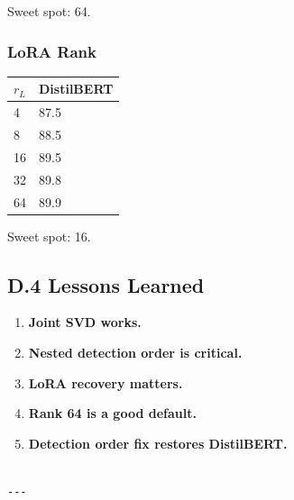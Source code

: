 Sweet spot: 64.

\subsubsection{LoRA Rank}

\begin{table}[H]
\centering
\small
\begin{tabular}{ll}
\toprule
\textbf{$r_L$} & \textbf{DistilBERT} \\
\midrule
4 & 87.5 \\
8 & 88.5 \\
16 & 89.5 \\
32 & 89.8 \\
64 & 89.9 \\
\bottomrule
\end{tabular}
\end{table}

Sweet spot: 16.

\subsection{D.4 Lessons Learned}

\begin{enumerate}
\item \textbf{Joint SVD works.}
\item \textbf{Nested detection order is critical.}
\item \textbf{LoRA recovery matters.}
\item \textbf{Rank 64 is a good default.}
\item \textbf{Detection order fix restores DistilBERT.}
\end{enumerate}
\begin{lstlisting}

---
\end{lstlisting}
